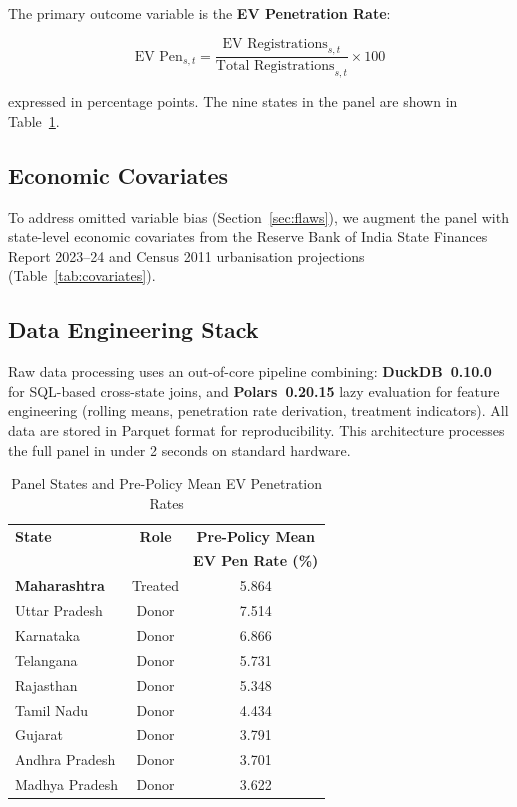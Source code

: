 \documentclass[journal]{IEEEtran}
\begin{document}
The primary outcome variable is the \textbf{EV Penetration Rate}:

\begin{equation}
  \text{EV Pen}_{s,t} = \frac{\text{EV Registrations}_{s,t}}
                              {\text{Total Registrations}_{s,t}} \times 100
  \label{eq:evpen}
\end{equation}

expressed in percentage points. The nine states in the panel are shown in
Table~\ref{tab:states}.

\subsection{Economic Covariates}
To address omitted variable bias (Section~\ref{sec:flaws}), we augment
the panel with state-level economic covariates from the Reserve Bank of
India State Finances Report 2023--24 and Census 2011 urbanisation
projections (Table~\ref{tab:covariates}).

\subsection{Data Engineering Stack}
Raw data processing uses an out-of-core pipeline combining:
\textbf{DuckDB~0.10.0} for SQL-based cross-state joins, and
\textbf{Polars~0.20.15} lazy evaluation for feature engineering
(rolling means, penetration rate derivation, treatment indicators).
All data are stored in Parquet format for reproducibility. This
architecture processes the full panel in under 2 seconds on standard
hardware.

\begin{table}[H]
\centering
\caption{Panel States and Pre-Policy Mean EV Penetration Rates}
\label{tab:states}
\begin{tabular}{lcc}
\toprule
\textbf{State} & \textbf{Role} & \textbf{Pre-Policy Mean} \\
               &               & \textbf{EV Pen Rate (\%)} \\
\midrule
\textbf{Maharashtra} & Treated & 5.864 \\
\midrule
Uttar Pradesh  & Donor & 7.514 \\
Karnataka      & Donor & 6.866 \\
Telangana      & Donor & 5.731 \\
Rajasthan      & Donor & 5.348 \\
Tamil Nadu     & Donor & 4.434 \\
Gujarat        & Donor & 3.791 \\
Andhra Pradesh & Donor & 3.701 \\
Madhya Pradesh & Donor & 3.622 \\
\bottomrule
\end{tabular}
\end{table}
\end{document}
